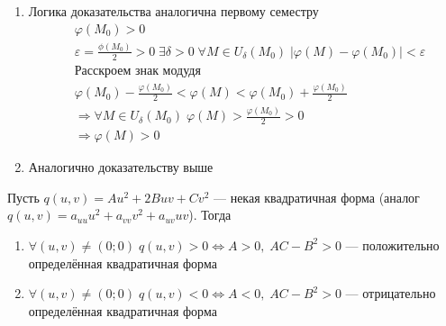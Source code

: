 	\begin{Proof}
		\begin{enumerate}
			\item Логика доказательства аналогична первому семестру
                \begin{align*}
    				&\varphi (M_0) > 0 \\ 
    				&\varepsilon = \frac{\phi (M_0)}{2} > 0 \; \exists \delta > 0 \; \forall M \in U_\delta(M_0) \; | \varphi (M) - \varphi (M_0) | < \varepsilon \\
                    &\text{Расскроем знак модудя}\\
    				&\varphi (M_0) - \frac{\varphi (M_0)}{2} < \varphi (M) < \varphi (M_0) + \frac{\varphi(M_0)}{2}\\
    				&\Rightarrow \forall M \in U_\delta(M_0) \; \varphi(M) > \frac{\varphi(M_0)}{2} > 0\\
    				&\Rightarrow \varphi(M) > 0
    			\end{align*}
			\item Аналогично доказательству выше
		\end{enumerate}
	\end{Proof}

    \begin{Lem}
        Пусть $q(u, v) = Au^2+2Buv+Cv^2$ --- некая квадратичная форма (аналог $ q(u, v)= a_{uu}u^2 + a_{vv}v^2 + a_{uv}uv$). Тогда
        \begin{enumerate}
            \item $\forall (u, v) \neq (0; 0) \; q(u, v) > 0 \Leftrightarrow A > 0, \; AC-B^2 > 0$ --- положительно определённая квадратичная форма 
            \item $\forall (u, v) \neq (0; 0) \; q(u, v) < 0 \Leftrightarrow A < 0, \; AC-B^2 > 0$ ---  отрицательно определённая квадратичная форма
        \end{enumerate}
    \end{Lem}

